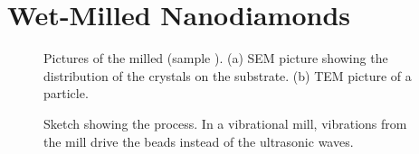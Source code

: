 	\section{Wet-Milled Nanodiamonds}

	\begin{figure}[tp]
		\begin{subfigure}[t]{ 0.49\linewidth}
			\caption{}\label{subfig::sem_milled}
			\centering
		\end{subfigure}
		\hfill
		\begin{subfigure}[t]{ 0.49\linewidth}
			\caption{}\label{subfig::tem_milled}
			\centering
		\end{subfigure}
		\caption{Pictures of the milled \nds (sample \insituH). (a) SEM picture showing the distribution of the \nd crystals on the \ir substrate. (b) TEM picture of a \nd particle.}
		\label{fig::semtem_millled}
	\end{figure}

	\begin{figure}[tp]
		\centering
		\caption{Sketch showing the \basd process. In a vibrational mill, vibrations from the mill drive the beads instead of the ultrasonic waves.}
		\label{fig::sketch_basd}
	\end{figure}

